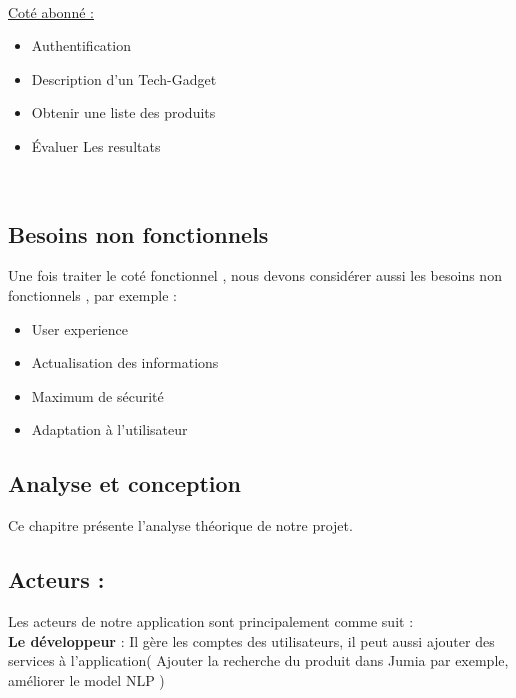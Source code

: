 \\

\underline {Coté abonné : }
\\
\begin{itemize} 

    \item Authentification
    \item Description d'un Tech-Gadget
    \item Obtenir une liste des produits
    \item Évaluer Les resultats \\
\end{itemize}
\\

\section{Besoins non fonctionnels}

Une fois traiter le coté fonctionnel , nous devons considérer aussi les besoins non fonctionnels , par exemple : \\

\begin{itemize}
    \item User experience
    \item Actualisation des informations
    \item Maximum de sécurité 
    \item Adaptation à l'utilisateur 
\end{itemize}


\begin{center}
\chapter{Analyse et conception}    
\end{center}

Ce chapitre présente l'analyse théorique de notre projet. \\
\section{Acteurs :}

Les acteurs  de notre application sont principalement comme suit : \\

\textbf{Le développeur} : Il gère les comptes des utilisateurs, il peut aussi ajouter des services à l'application( Ajouter la recherche du produit dans Jumia par exemple, améliorer le model NLP )

